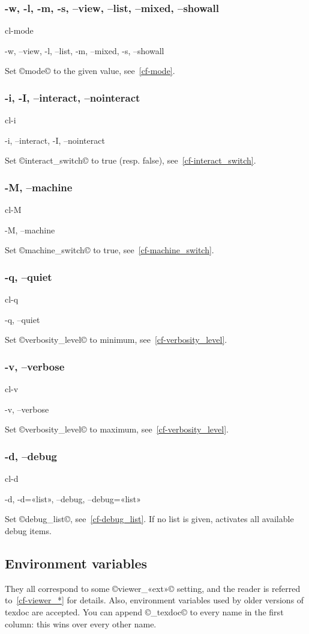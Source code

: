 \documentclass[a4paper, oneside]{scrartcl}
\newif\ifframed
\newenvironment{cmdsubsub}[2]{%
  \framedfalse \commandes\subsubsection{#1}{#2}%
  }{%
  \endcommandes}
\begin{document}
\begin{cmdsubsub}{-w, -l, -m, -s, --view, --list, --mixed, --showall}{cl-mode}
  -w, --view, -l, --list, -m, --mixed, -s, --showall
\end{cmdsubsub}

Set ©mode© to the given value, see~\ref{cf-mode}.

\begin{cmdsubsub}{-i, -I, --interact, --nointeract}{cl-i}
  -i, --interact, -I, --nointeract
\end{cmdsubsub}

Set ©interact_switch© to true (resp. false), see~\ref{cf-interact_switch}.

\begin{cmdsubsub}{-M, --machine}{cl-M}
  -M, --machine
\end{cmdsubsub}

Set ©machine_switch© to true, see~\ref{cf-machine_switch}.

\begin{cmdsubsub}{-q, --quiet}{cl-q}
  -q, --quiet
\end{cmdsubsub}

Set ©verbosity_level© to minimum, see~\ref{cf-verbosity_level}.

\begin{cmdsubsub}{-v, --verbose}{cl-v}
  -v, --verbose
\end{cmdsubsub}

Set ©verbosity_level© to maximum, see~\ref{cf-verbosity_level}.

\begin{cmdsubsub}{-d, --debug}{cl-d}
  -d, -d=«list», --debug, --debug=«list»
\end{cmdsubsub}

Set ©debug_list©, see~\ref{cf-debug_list}. If no list is given, activates all
available debug items.

\subsection{Environment variables}\label{ss-envvar}

They all correspond to some ©viewer_«ext»© setting, and the reader is referred
to~\ref{cf-viewer_*} for details. Also, environment variables used by older
versions of texdoc are accepted. You can append ©_texdoc© to every name in
the first column: this wins over every other name.
\end{document}
